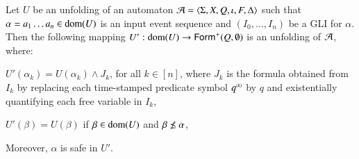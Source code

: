 \begin{lemma}\label{lemma:refinement}
  Let $U$ be an unfolding of an automaton $\mathcal{A} =
  \langle \Sigma,X,Q,\iota,F,\Delta \rangle$ such that $\alpha = a_1\ldots a_n
  \in \mathrm{dom}(U)$ is an input event sequence and $(I_0, \ldots, I_n)$ be
  a GLI for $\alpha$. Then the following mapping $U' : \mathrm{dom}(U)
  \rightarrow \mathsf{Form}^+(Q,\emptyset)$ is an unfolding of $\mathcal{A}$, where:
  \begin{compactitem}
  \item $U'(\alpha_k) = U(\alpha_k) \wedge J_k$, for all $k \in [n]$,
    where $J_k$ is the formula obtained from $I_k$ by replacing each
    time-stamped predicate symbol ${q}^{\scriptscriptstyle{({k})}}$ by $q$ and
    existentially quantifying each free variable in $I_k$,
\item $U'(\beta) = U(\beta)$ if $\beta \in \mathrm{dom}(U)$ and $\beta
  \not\prefix \alpha$,
  \end{compactitem}
  Moreover, $\alpha$ is safe in $U'$.
\end{lemma}
